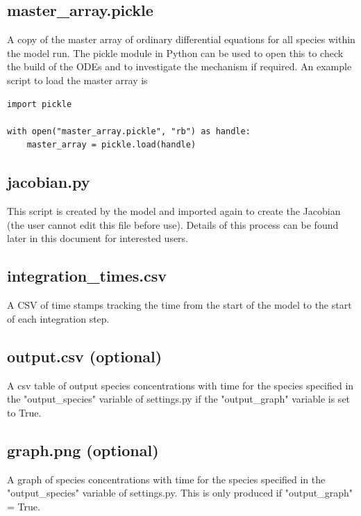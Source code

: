 \documentclass[a4paper]{refart}
\begin{document}
\subsection{master\_array.pickle}
A copy of the master array of ordinary differential equations for all species within the model run. The pickle module in Python can be used to open this to check the build of the ODEs and to investigate the mechanism if required. An example script to load the master array is
\begin{verbatim}
import pickle
    
with open("master_array.pickle", "rb") as handle:
    master_array = pickle.load(handle)
\end{verbatim}


\subsection{jacobian.py}
This script is created by the model and imported again to create the Jacobian (the user cannot edit this file before use). Details of this process can be found later in this document for interested users. 

\subsection{integration\_times.csv}
A CSV of time stamps tracking the time from the start of the model to the start of each integration step. 

\subsection{output.csv (optional)}
A csv table of output species concentrations with time for the species specified in the "output\_species" variable of settings.py if the "output\_graph" variable is set to True.

\subsection{graph.png (optional)}
A graph of species concentrations with time for the species specified in the "output\_species" variable of settings.py. This is only produced if "output\_graph" = True.
\end{document}
